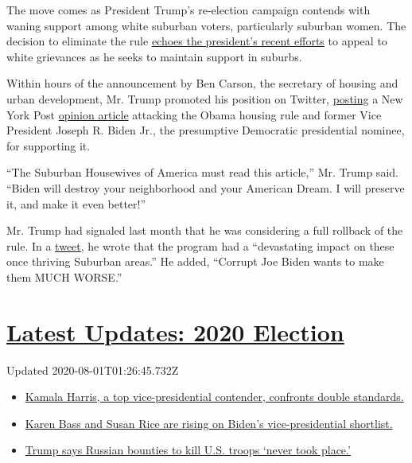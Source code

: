 The move comes as President Trump's re-election campaign contends with
waning support among white suburban voters, particularly suburban women.
The decision to eliminate the rule
\href{https://www.nytimes.com/2020/07/01/us/politics/trump-obama-housing-discrimination.html}{echoes
the president's recent efforts} to appeal to white grievances as he
seeks to maintain support in suburbs.

Within hours of the announcement by Ben Carson, the secretary of housing
and urban development, Mr. Trump promoted his position on Twitter,
\href{https://twitter.com/realDonaldTrump/status/1286372175117791236?s=20}{posting}
a New York Post
\href{https://nypost.com/2020/07/21/joe-bidens-disastrous-plans-for-americas-suburbs/}{opinion
article} attacking the Obama housing rule and former Vice President
Joseph R. Biden Jr., the presumptive Democratic presidential nominee,
for supporting it.

``The Suburban Housewives of America must read this article,'' Mr. Trump
said. ``Biden will destroy your neighborhood and your American Dream. I
will preserve it, and make it even better!''

Mr. Trump had signaled last month that he was considering a full
rollback of the rule. In a
\href{https://twitter.com/realdonaldtrump/status/1278136326647406593?lang=en}{tweet},
he wrote that the program had a ``devastating impact on these once
thriving Suburban areas.'' He added, ``Corrupt Joe Biden wants to make
them MUCH WORSE.''

\hypertarget{latest-updates-2020-election}{%
\section{\texorpdfstring{\href{https://www.nytimes.com/2020/07/31/us/elections/biden-vs-trump.html?action=click\&pgtype=Article\&state=default\&region=MAIN_CONTENT_1\&context=storylines_live_updates}{Latest
Updates: 2020
Election}}{Latest Updates: 2020 Election}}\label{latest-updates-2020-election}}

Updated 2020-08-01T01:26:45.732Z

\begin{itemize}
\tightlist
\item
  \href{https://www.nytimes.com/2020/07/31/us/elections/biden-vs-trump.html?action=click\&pgtype=Article\&state=default\&region=MAIN_CONTENT_1\&context=storylines_live_updates\#link-29fdff45}{Kamala
  Harris, a top vice-presidential contender, confronts double
  standards.}
\item
  \href{https://www.nytimes.com/2020/07/31/us/elections/biden-vs-trump.html?action=click\&pgtype=Article\&state=default\&region=MAIN_CONTENT_1\&context=storylines_live_updates\#link-13ec3d9c}{Karen
  Bass and Susan Rice are rising on Biden's vice-presidential
  shortlist.}
\item
  \href{https://www.nytimes.com/2020/07/31/us/elections/biden-vs-trump.html?action=click\&pgtype=Article\&state=default\&region=MAIN_CONTENT_1\&context=storylines_live_updates\#link-49e9a016}{Trump
  says Russian bounties to kill U.S. troops `never took place.'}
\end{itemize}

